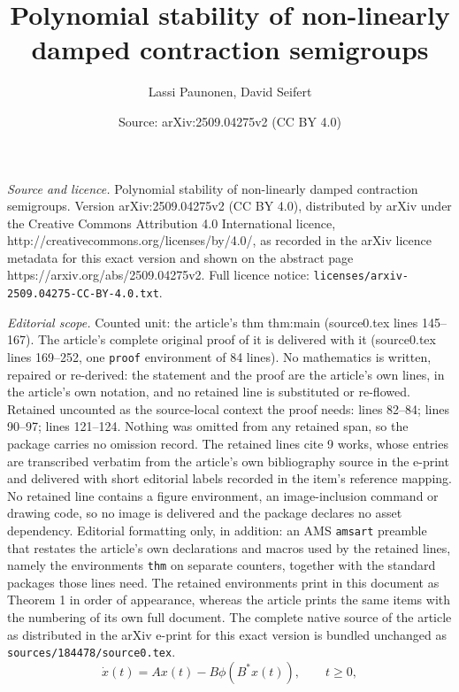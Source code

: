 \documentclass[10pt,a4paper]{amsart}
\title{Polynomial stability of non-linearly damped contraction semigroups}
\author{Lassi Paunonen, David Seifert}
\date{Source: arXiv:2509.04275v2 (CC BY 4.0)}
\begin{document}
\maketitle

\noindent\emph{Source and licence.} Polynomial stability of non-linearly damped contraction semigroups. Version arXiv:2509.04275v2 (CC BY 4.0), distributed by arXiv under the Creative Commons Attribution 4.0 International licence, http://creativecommons.org/licenses/by/4.0/, as recorded in the arXiv licence metadata for this exact version and shown on the abstract page https://arxiv.org/abs/2509.04275v2. Full licence notice: \texttt{licenses/arxiv-2509.04275-CC-BY-4.0.txt}.\par\smallskip

\noindent\textit{Editorial scope.} Counted unit: the article's thm thm:main (source0.tex lines 145--167). The article's complete original proof of it is delivered with it (source0.tex lines 169--252, one \texttt{proof} environment of 84 lines). No mathematics is written, repaired or re-derived: the statement and the proof are the article's own lines, in the article's own notation, and no retained line is substituted or re-flowed.  Retained uncounted as the source-local context the proof needs: lines 82--84; lines 90--97; lines 121--124.  Nothing was omitted from any retained span, so the package carries no omission record.  The retained lines cite 9 works, whose entries are transcribed verbatim from the article's own bibliography source in the e-print and delivered with short editorial labels recorded in the item's reference mapping.  No retained line contains a figure environment, an image-inclusion command or drawing code, so no image is delivered and the package declares no asset dependency.  Editorial formatting only, in addition: an AMS \texttt{amsart} preamble that restates the article's own declarations and macros used by the retained lines, namely the environments \texttt{thm} on separate counters, together with the standard packages those lines need.  The retained environments print in this document as Theorem 1 in order of appearance, whereas the article prints the same items with the numbering of its own full document.  The complete native source of the article as distributed in the arXiv e-print for this exact version is bundled unchanged as \texttt{sources/184478/source0.tex}.
\begin{equation}\label{eq:sys}
\dot x(t)=Ax(t) - B\phi(B^\ast x(t)), \qquad t\ge0,
\end{equation}
\end{document}
